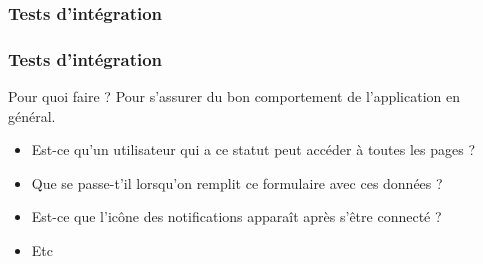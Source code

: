 \documentclass{beamer}
\begin{document}
      \subsubsection{Tests d'intégration}
      \begin{frame}
        \frametitle{Tests d'intégration}
        \begin{block}{Pour quoi faire ?}
          Pour s'assurer du bon comportement de l'application en général.
          \begin{itemize}
            \item Est-ce qu'un utilisateur qui a ce statut peut accéder à toutes les pages ?
            \item Que se passe-t'il lorsqu'on remplit ce formulaire avec ces données ?
            \item Est-ce que l'icône des notifications apparaît après s'être connecté ?
            \item Etc
          \end{itemize}           
        \end{block}      
      \end{frame}
\end{document}

